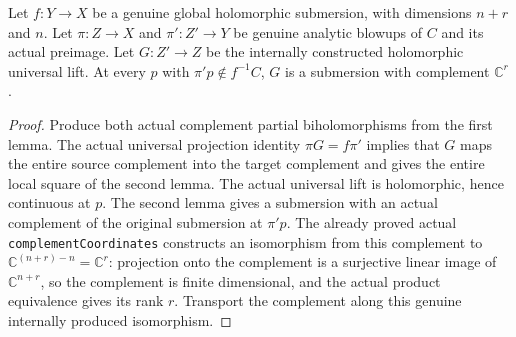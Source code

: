 \begin{lemma}
\label{hir:submersion-blowup-actual-lift-off-centre-submersion}
\leanok
{}
Let $f:Y\to X$ be a genuine global holomorphic submersion, with dimensions
$n+r$ and $n$. Let $\pi:Z\to X$ and $\pi':Z'\to Y$ be genuine analytic
blowups of $C$ and its actual preimage. Let $G:Z'\to Z$ be the internally
constructed holomorphic universal lift. At every $p$ with $\pi'p\notin f^{-1}C$,
$G$ is a submersion with complement $\mathbb C^r$.
\end{lemma}
\begin{proof}
Produce both actual complement partial biholomorphisms from the first lemma.
The actual universal projection identity $\pi G=f\pi'$ implies that $G$ maps
the entire source complement into the target complement and gives the entire
local square of the second lemma. The actual universal lift is holomorphic,
hence continuous at $p$. The second lemma gives a submersion with an actual
complement of the original submersion at $\pi'p$. The already proved actual
\texttt{complementCoordinates} constructs an isomorphism from this complement
to $\mathbb C^{(n+r)-n}=\mathbb C^r$: projection onto the complement is a
surjective linear image of $\mathbb C^{n+r}$, so the complement is finite
dimensional, and the actual product equivalence gives its rank $r$. Transport
the complement along this genuine internally produced isomorphism.
\end{proof}

